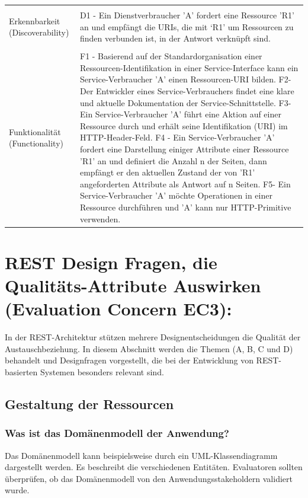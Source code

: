 \documentclass{acmsiggraph}
\begin{document}
\begin{center}
\begin{xtabular}{|C{2cm}|L{6cm}|}
 \\ 
     \hline 
     & \\[-2ex]
   Erkennbarkeit  (Discoverability) & 
     D1 - Ein Dienstverbraucher 'A' fordert eine Ressource 'R1' an und empfängt die URIs, die mit ‘R1’ um Ressourcen zu finden verbunden ist, in der Antwort verknüpft sind.
 \\ 
       \hline 
      & \\[-2ex]
     Funktionalität  (Functionality) & 
     F1 - Basierend auf der Standardorganisation einer Ressourcen-Identifikation in einer Service-Interface kann ein Service-Verbraucher 'A' einen Ressourcen-URI bilden.
F2- Der Entwickler eines Service-Verbrauchers findet eine klare und aktuelle Dokumentation der Service-Schnittstelle.
F3- Ein Service-Verbraucher 'A' führt eine Aktion auf einer Ressource durch und erhält seine Identifikation (URI) im HTTP-Header-Feld.
F4 - Ein Service-Verbraucher 'A' fordert eine Darstellung einiger Attribute einer Ressource 'R1' an und definiert die Anzahl n der Seiten, dann empfängt er den aktuellen Zustand der von 'R1' angeforderten Attribute als Antwort auf n Seiten.
F5- Ein Service-Verbraucher 'A' möchte Operationen in einer Ressource durchführen und 'A' kann nur HTTP-Primitive verwenden.
\\    
\hline

 \end{xtabular}
 \end{center}




\section{REST Design Fragen, die Qualitäts-Attribute Auswirken (Evaluation Concern EC3):}

In der REST-Architektur stützen mehrere Designentscheidungen die Qualität der Austauschbeziehung. In diesem Abschnitt werden die Themen (A, B, C und D) behandelt und Designfragen vorgestellt, die bei der Entwicklung von REST-basierten Systemen besonders relevant sind.

\subsection{Gestaltung der Ressourcen}
\subsubsection{Was ist das Domänenmodell der Anwendung?}
Das Domänenmodell kann beispielsweise durch ein UML-Klassendiagramm dargestellt werden. Es beschreibt die verschiedenen Entitäten. Evaluatoren sollten überprüfen, ob das Domänenmodell von den Anwendungsstakeholdern validiert wurde.
\end{document}
